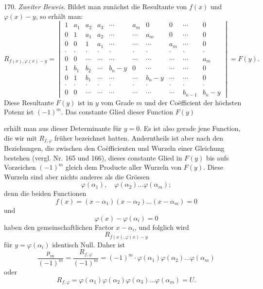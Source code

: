 \documentclass[11pt]{article}
\providecommand{\weberpage}[1]{}
\begin{document}
170. \textit{Zweiter Beweis.} Bildet man zunächst die Resultante von
$f(x)$ und $\varphi(x) - y$, so erhält man:
\[
R_{f(x),\varphi(x)-y} =
\begin{vmatrix}
1 & a_1 & a_2 & a_3 & \cdots & a_m & 0 & 0 & \cdots & 0 \\
0 & 1 & a_1 & a_2 & \cdots & \cdots & a_m & 0 & \cdots & 0 \\
0 & 0 & 1 & a_1 & \cdots & \cdots & \cdots & a_m & \cdots & 0 \\
\cdot & \cdot & \cdot & \cdot & \cdot & \cdot & \cdot & \cdot & \cdot & \cdot \\
0 & 0 & \cdots & \cdots & \cdots & \cdots & \cdots & \cdots & \cdots & a_m \\
1 & b_1 & b_2 & \cdots & b_n - y & 0 & \cdots & \cdots & \cdots & 0 \\
0 & 1 & b_1 & \cdots & \cdots & \cdots & b_n - y & \cdots & \cdots & 0 \\
\cdot & \cdot & \cdot & \cdot & \cdot & \cdot & \cdot & \cdot & \cdot & \cdot \\
0 & 0 & \cdots & \cdots & \cdots & \cdots & \cdots & \cdots & b_{n-1} & b_n - y
\end{vmatrix}
= F(y).
\]
Diese Resultante $F(y)$ ist in $y$ vom Grade $m$ und der Coëfficient der
höchsten Potenz ist $(-1)^m$. Das constante Glied dieser Function $F(y)$


\weberpage{182}
erhält man aus dieser Determinante für $y = 0$. Es ist also gerade jene
Function, die wir mit $R_{f,\varphi}$ früher bezeichnet hatten.
Anderntheils ist aber nach den Beziehungen, die zwischen den
Coëfficienten und Wurzeln einer Gleichung bestehen (vergl. Nr. 165 und
166), dieses constante Glied in $F(y)$ bis aufs Vorzeichen $(-1)^m$
gleich dem Producte aller Wurzeln von $F(y)$. Diese Wurzeln sind aber
nichts anderes als die Grössen
\[
\varphi(\alpha_1), \quad \varphi(\alpha_2) \ldots \varphi(\alpha_m);
\]
denn die beiden Functionen
\[
f(x) = (x - \alpha_1)(x - \alpha_2) \ldots (x - \alpha_m) = 0
\]
und
\[
\varphi(x) - \varphi(\alpha_i) = 0
\]
haben den gemeinschaftlichen Factor $x - \alpha_i$, und folglich wird
\[
R_{f(x),\varphi(x)-y}
\]
für $y = \varphi(\alpha_i)$ identisch Null. Daher ist
\[
\frac{p_m}{(-1)^m} = \frac{R_{f,\varphi}}{(-1)^m} = (-1)^m \cdot \varphi(\alpha_1) \varphi(\alpha_2) \ldots \varphi(\alpha_m)
\]
oder
\[
R_{f,\varphi} = \varphi(\alpha_1) \varphi(\alpha_2) \varphi(\alpha_3) \ldots \varphi(\alpha_m) = U.
\]
\end{document}
